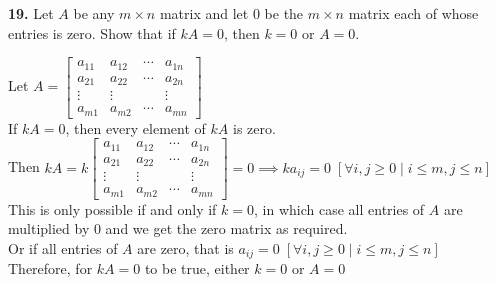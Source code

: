 \documentclass[addpoints]{exam}
\begin{document}
\begin{sloppypar}
\begin{questions}
    \question
    \textbf{19. } Let $A$ be any $ m \times n $ matrix and let 0 be the $ m \times n $ matrix each of whose entries is zero. Show that if $kA = 0$, then $ k = 0 $ or $ A = 0 $.
    \begin{solution}
        Let $ A = \begin{bmatrix}
            a_{11} & a_{12} & \cdots & a_{1n} \\ 
            a_{21} & a_{22} & \cdots & a_{2n} \\ 
            \vdots & \vdots & & \vdots \\ 
            a_{m1} & a_{m2} & \cdots & a_{mn}
        \end{bmatrix}$\\
        If $ kA = 0 $, then every element of $kA$ is zero. \\ 
        Then $ kA = k\begin{bmatrix}
            a_{11} & a_{12} & \cdots & a_{1n} \\ 
            a_{21} & a_{22} & \cdots & a_{2n} \\ 
            \vdots & \vdots & & \vdots \\ 
            a_{m1} & a_{m2} & \cdots & a_{mn}
        \end{bmatrix} = 0 \implies ka_{ij} = 0 \; [\forall i, j \geq 0 \; | \; i \leq m, j \leq n]$ \\ 
        This is only possible if and only if $ k = 0 $, in which case all entries of $A$ are multiplied by 0 and we get the zero matrix as required. \\ 
        Or if all entries of $A$ are zero, that is $ a_{ij} = 0 \; [\forall i, j \geq 0 \; | \; i \leq m, j \leq n] $\\ 
        Therefore, for $ kA = 0 $ to be true, either $k = 0$ or $A = 0$
    \end{solution}


\end{questions}
\end{sloppypar}
\end{document}

